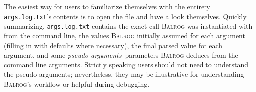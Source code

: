 \documentclass[11pt]{book}
\newcommand{\codett}[1]{\lstinline{#1}}
\newcommand{\galsim}{\textsc{GalSim}}
\newcommand{\balrog}{\textsc{Balrog}}
\newcommand{\sersic}{S\'{e}rsic}
\begin{document}
The easiest way for users to familiarize themselves with the entirety \codett{args.log.txt}'s contents is to
open the file and have a look themselves.
Quickly summarizing, \codett{args.log.txt} contains the exact call \balrog{} was
instantiated with from the command line, the values \balrog{} initially assumed
for each argument (filling in with defaults where necessary), the final parsed value
for each argument, and some \emph{pseudo arguments}--parameters \balrog{} deduces from
the command line arguments. Strictly speaking users should not need to understand the 
pseudo arguments; nevertheless, they may be illustrative
for understanding \balrog{}'s workflow or helpful during debugging.


\outtab{}



%
%
\end{document}
